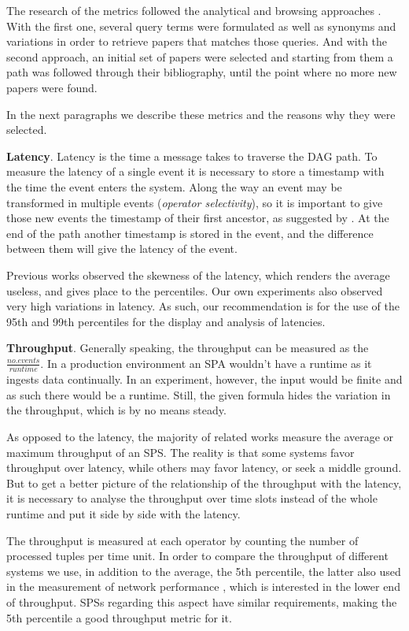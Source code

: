 \documentclass[ppgc,diss,english]{iiufrgs}
\begin{document}
The research of the metrics followed the analytical and browsing approaches \cite{best2014systematically}. With the first one, several query terms were formulated as well as synonyms and variations in order to retrieve papers that matches those queries. And with the second approach, an initial set of papers were selected and starting from them a path was followed through their bibliography, until the point where no more new papers were found.

In the next paragraphs we describe these metrics and the reasons why they were selected.

\textbf{Latency}. Latency is the time a message takes to traverse the DAG path. To measure the latency of a single event it is necessary to store a timestamp with the time the event enters the system. Along the way an event may be transformed in multiple events (\emph{operator selectivity}), so it is important to give those new events the timestamp of their first ancestor, as suggested by \cite{chandramouli2011accurate}. At the end of the path another timestamp is stored in the event, and the difference between them will give the latency of the event.

Previous works \cite{dayarathna2011performance, akidau2013millwheel, castro2013integrating} observed the skewness of the latency, which renders the average useless, and gives place to the percentiles. Our own experiments also observed very high variations in latency. As such, our recommendation is for the use of the 95th and 99th percentiles for the display and analysis of latencies.

\textbf{Throughput}. Generally speaking, the throughput can be measured as the $\frac{no. events}{runtime}$. In a production environment an SPA wouldn't have a runtime as it ingests data continually. In an experiment, however, the input would be finite and as such there would be a runtime. Still, the given formula hides the variation in the throughput, which is by no means steady.

As opposed to the latency, the majority of related works measure the average or maximum throughput of an SPS. The reality is that some systems favor throughput over latency, while others may favor latency, or seek a middle ground. But to get a better picture of the relationship of the throughput with the latency, it is necessary to analyse the throughput over time slots instead of the whole runtime and put it side by side with the latency.

The throughput is measured at each operator by counting the number of processed tuples per time unit. In order to compare the throughput of different systems we use, in addition to the average, the 5th percentile, the latter also used in the measurement of network performance \cite{litjens2010potential, landstrom2011deployment}, which is interested in the lower end of throughput. SPSs regarding this aspect have similar requirements, making the 5th percentile a good throughput metric for it.
\end{document}
